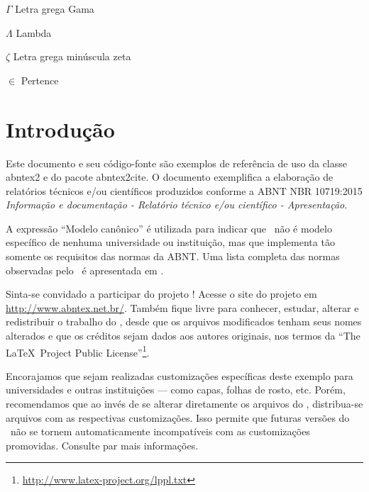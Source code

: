 \documentclass[
12pt,				%
openright,			%
twoside,			%
a4paper,			%
english,			%
french,				%
spanish,			%
brazil,				%
]{abntex2}
\begin{document}
	\begin{simbolos}
		\item[$ \Gamma $] Letra grega Gama
		\item[$ \Lambda $] Lambda
		\item[$ \zeta $] Letra grega minúscula zeta
		\item[$ \in $] Pertence
	\end{simbolos}
	
	\tableofcontents*
	\cleardoublepage
	
	
	\textual
	
	\chapter*[Introdução]{Introdução}
	
	Este documento e seu código-fonte são exemplos de referência de uso da classe
	\textsf{abntex2} e do pacote \textsf{abntex2cite}. O documento 
	exemplifica a elaboração de relatórios técnicos e/ou científicos produzidos
	conforme a ABNT NBR 10719:2015 \emph{Informação e documentação - Relatório
		técnico e/ou científico - Apresentação}.
	
	A expressão ``Modelo canônico'' é utilizada para indicar que \abnTeX\ não é
	modelo específico de nenhuma universidade ou instituição, mas que implementa tão
	somente os requisitos das normas da ABNT. Uma lista completa das normas
	observadas pelo \abnTeX\ é apresentada em .
	
	Sinta-se convidado a participar do projeto \abnTeX! Acesse o site do projeto em
	\url{http://www.abntex.net.br/}. Também fique livre para conhecer,
	estudar, alterar e redistribuir o trabalho do \abnTeX, desde que os arquivos
	modificados tenham seus nomes alterados e que os créditos sejam dados aos
	autores originais, nos termos da ``The \LaTeX\ Project Public
	License''\footnote{\url{http://www.latex-project.org/lppl.txt}}.
	
	Encorajamos que sejam realizadas customizações específicas deste exemplo para
	universidades e outras instituições --- como capas, folhas de rosto, etc.
	Porém, recomendamos que ao invés de se alterar diretamente os arquivos do
	\abnTeX, distribua-se arquivos com as respectivas customizações.
	Isso permite que futuras versões do \abnTeX~não se tornem automaticamente
	incompatíveis com as customizações promovidas. Consulte
	 par mais informações.
	
\end{document}
